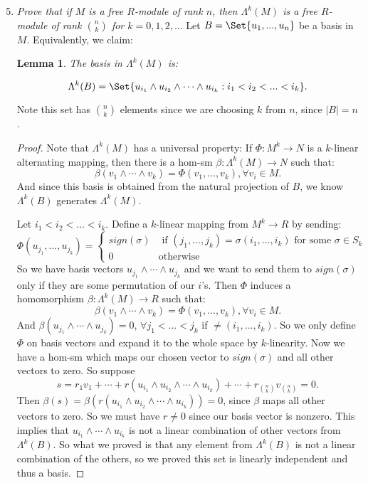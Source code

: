 \documentclass[9pt,reqno,twoside]{amsbook}
\theoremstyle{plain}
\numberwithin{section}{chapter}
\numberwithin{equation}{chapter}
\newtheorem{lem}[theorem]{Lemma}
\theoremstyle{definition}
\theoremstyle{remark}
\theoremstyle{plain}
\begin{document}
\begin{enumerate}[label=\arabic*.]
\setcounter{enumi}{4}
\item \textit{Prove that if $M$ is a free $R$-module of rank $n$, then $\Lambda^k(M)$ is a free $R$-module of rank $\binom{n}{k}$ for $k = 0,1,2,...$} 
Let $B = \Set{u_1,...,u_n}$ be a basis in $M$. Equivalently, we claim:
\begin{lem}
 The basis in $\Lambda^k(M)$ is:
 
 $$
 \Lambda^k(B) = \Set{u_{i_1} \wedge u_{i_2} \wedge \cdots \wedge u_{i_k}: i_1 < i_2 < ... < i_k}.
 $$
\end{lem}
Note this set has $\binom{n}{k}$ elements since we are choosing $k$ from $n$, since $|B| = n$. 
\begin{proof}
 Note that $\Lambda^k(M)$ has a universal property: If $\Phi:M^k \to N$ is a $k$-linear alternating mapping, then there is a hom-sm $\beta:\Lambda^k(M) \to N$ such that: 
 $$
 \beta(v_1 \wedge \cdots \wedge v_k) = \Phi(v_1,...,v_k), \forall v_i \in M.
 $$
 And since this basis is obtained from the natural projection of $B$, we know $\Lambda^k(B)$ generates $\Lambda^k(M)$.


Let $i_1 < i_2 < ... < i_k$. Define a $k$-linear mapping from $M^k \to R$ by sending: 
$$
\Phi(u_{j_1},...,u_{j_k}) = \begin{cases}
sign(\sigma) & \text{ if }(j_1,...,j_k) = \sigma(i_1,...,i_k) \text{ for some }\sigma \in S_k\\
0 & \text{otherwise}
\end{cases}
$$
So we have basis vectors $u_{j_1}\wedge \cdots \wedge u_{j_k}$ and we want to send them to $sign(\sigma)$ only if they are some permutation of our $i$'s. Then $\Phi$ induces a homomorphism $\beta:\Lambda^k(M) \to R$ such that:
$$
 \beta(v_1 \wedge \cdots \wedge v_k) = \Phi(v_1,...,v_k), \forall v_i \in M.
 $$
And $\beta(u_{j_1}  \wedge \cdots \wedge u_{j_k}) = 0$, $\forall j_1 < ...< j_k$ if $\neq (i_1,...,i_k)$. So we only define $\Phi$ on basis vectors and expand it to the whole space by $k$-linearity. Now we have a hom-sm which maps our chosen vector to $sign(\sigma)$ and all other vectors to zero. So suppose 
$$
s = r_1v_1 + \cdots + r( u_{i_1} \wedge u_{i_2} \wedge \cdots \wedge u_{i_k}) + \cdots + r_{\binom{n}{k}}v_{\binom{n}{k}} = 0.
$$
Then $\beta(s) = \beta(r( u_{i_1} \wedge u_{i_2} \wedge \cdots \wedge u_{i_k})) = 0$, since $\beta$ maps all other vectors to zero. So we must have $r \neq 0$ since our basis vector is nonzero. 
 This implies that $u_{i_1}  \wedge \cdots \wedge u_{i_k}$ is not a linear combination of other vectors from $\Lambda^k(B)$. So what we proved is that any element from $\Lambda^k(B)$ is not a linear combination of the others, so we proved this set is linearly independent and thus a basis. 
\end{proof}


\end{enumerate}
\end{document}
